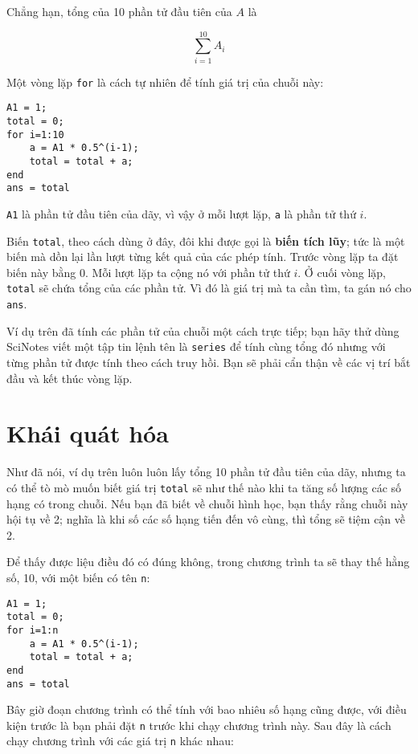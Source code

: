 \documentclass[12pt]{book}
\begin{document}
Chẳng hạn, tổng của 10 phần tử đầu tiên của $A$ là

\[ \sum_{i=1}^{10} A_i \]

Một vòng lặp {\tt for} là cách tự nhiên để tính giá trị của
chuỗi này:

\begin{verbatim}
A1 = 1;
total = 0;
for i=1:10
    a = A1 * 0.5^(i-1);
    total = total + a;
end
ans = total
\end{verbatim}

{\tt A1} là phần tử đầu tiên của dãy, vì vậy ở mỗi lượt lặp, 
{\tt a} là phần tử thứ $i$.

Biến {\tt total}, theo cách dùng ở đây, đôi khi được gọi là 
{\bf biến tích lũy}; tức là một biến mà dồn lại lần lượt từng kết quả 
của các phép tính. Trước vòng lặp ta đặt biến này bằng 0.  Mỗi
lượt lặp ta cộng nó với phần tử thứ $i$. Ở cuối vòng lặp, 
{\tt total} sẽ chứa tổng của các phần tử. Vì đó là giá trị mà
ta cần tìm, ta gán nó cho {\tt ans}.

\begin{ex}
Ví dụ trên đã tính các phần tử của chuỗi một cách trực tiếp;
bạn hãy thử dùng SciNotes viết một tập tin lệnh tên là {\tt series} để tính
cùng tổng đó nhưng với từng phần tử được tính theo cách
truy hồi. Bạn sẽ phải cẩn thận về các vị trí bắt đầu và kết thúc
vòng lặp.
\end{ex}


\section{Khái quát hóa}

Như đã nói, ví dụ trên luôn luôn lấy tổng 10 phần tử đầu tiên
của dãy, nhưng ta có thể tò mò muốn biết giá trị {\tt total}
sẽ như thế nào khi ta tăng số lượng các số hạng có trong chuỗi.
Nếu bạn đã biết về chuỗi hình học, bạn thấy rằng chuỗi này
hội tụ về 2; nghĩa là khi số các số hạng tiến đến vô cùng, thì
tổng sẽ tiệm cận về 2.

Để thấy được liệu điều đó có đúng không, trong chương trình
ta sẽ thay thế hằng số, 10, với một biến có tên {\tt n}:

\begin{verbatim}
A1 = 1;
total = 0;
for i=1:n
    a = A1 * 0.5^(i-1);
    total = total + a;
end
ans = total
\end{verbatim}

Bây giờ đoạn chương trình có thể tính với bao nhiêu số hạng
cũng được, với điều kiện trước là bạn phải đặt {\tt n} trước khi
chạy chương trình này. Sau đây là cách chạy chương trình
với các giá trị {\tt n} khác nhau:
\end{document}
